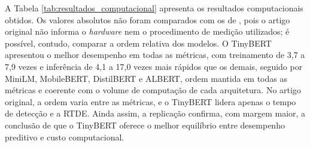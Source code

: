 \documentclass[12pt]{article}
\begin{document}
    \begin{table}[ht]
    \centering
    \caption{Desempenho computacional dos cinco modelos na replicação}
    \label{tab:resultados_computacional}
    \end{table}
 
        
        A Tabela \ref{tab:resultados_computacional} apresenta os resultados computacionais obtidos. Os valores absolutos não foram comparados com os de \cite{bispo2025philder}, pois o artigo original não informa o \textit{hardware} nem o procedimento de medição utilizados; é possível, contudo, comparar a ordem relativa dos modelos. O TinyBERT apresentou o melhor desempenho em todas as métricas, com treinamento de 3,7 a 7,9 vezes e inferência de 4,1 a 17,0 vezes mais rápidos que os demais, seguido por MiniLM, MobileBERT, DistilBERT e ALBERT, ordem mantida em todas as métricas e coerente com o volume de computação de cada arquitetura. No artigo original, a ordem varia entre as métricas, e o TinyBERT lidera apenas o tempo de detecção e a RTDE. Ainda assim, a replicação confirma, com margem maior, a conclusão de que o TinyBERT oferece o melhor equilíbrio entre desempenho preditivo e custo computacional. 
\end{document}
